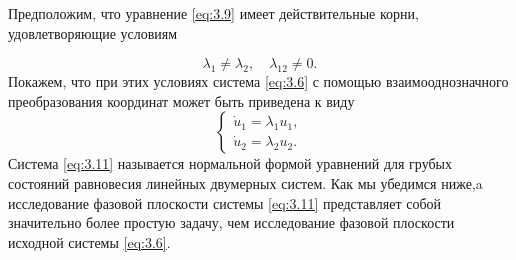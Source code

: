 Предположим, что уравнение \eqref{eq:3.9} имеет действительные корни, удовлетворяющие условиям

\begin{equation}
        \label{eq:3.10}
        \lambda_1\neq \lambda_2, \quad \lambda_{12}\neq 0.
\end{equation}
Покажем, что при этих условиях система \eqref{eq:3.6} с помощью взаимооднозначного преобразования координат может быть приведена к виду
\begin{equation}
        \label{eq:3.11}
        \begin{cases}
                \dot u_1 = \lambda_1 u_1,\\
                \dot u_2 = \lambda_2 u_2.
        \end{cases}
\end{equation}
Система \eqref{eq:3.11} называется нормальной формой уравнений для грубых состояний равновесия линейных двумерных систем. Как мы убедимся ниже,a исследование фазовой плоскости системы \eqref{eq:3.11} представляет собой значительно более простую задачу, чем исследование фазовой плоскости исходной   системы \eqref{eq:3.6}.

